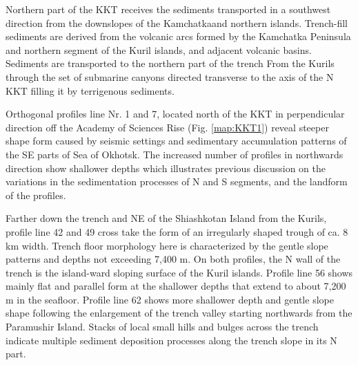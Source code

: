 \documentclass[11pt,a4paper]{report}
\begin{document}
{Northern part of the \ac{KKT} receives the sediments transported in a southwest direction from the downslopes of the Kamchatkaand northern islands. Trench-fill sediments are derived from the volcanic arcs formed by the Kamchatka Peninsula and northern segment of the Kuril islands, and adjacent volcanic basins. Sediments are transported to the northern part of the trench From the Kurils through the set of submarine canyons directed transverse to the axis of the N \ac{KKT} filling it by terrigenous sediments.

Orthogonal profiles line Nr. 1 and 7, located north of the \ac{KKT} in perpendicular direction off the Academy of Sciences Rise (Fig. \ref{map:KKT1}) reveal steeper shape form caused by seismic settings and sedimentary accumulation patterns of the SE parts of Sea of Okhotsk. The increased number of profiles in northwards direction show shallower depths which illustrates previous discussion on the variations in the sedimentation processes of N and S segments, and the landform of the profiles.

Farther down the trench and NE of the Shiashkotan Island from the Kurils, profile line 42 and 49 cross take the form of an irregularly shaped trough of ca. 8 km width. Trench floor morphology here is characterized by the gentle slope patterns and depths not exceeding 7,400 m. On both profiles, the N wall of the trench is the island-ward sloping surface of the Kuril islands. Profile line 56 shows mainly flat and parallel form at the shallower depths that extend to about 7,200 m in the seafloor. Profile line 62 shows more shallower depth and gentle slope shape following the enlargement of the trench valley starting northwards from the Paramushir Island. Stacks of local small hills and bulges across the trench indicate multiple sediment deposition processes along the trench slope in its N part.

}
\end{document}
